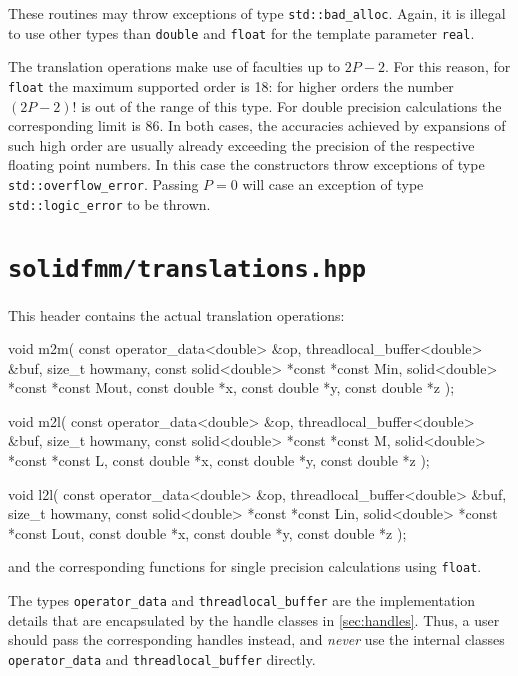 \documentclass{scrbook}
\begin{document}
These routines may throw exceptions of type \lstinline|std::bad_alloc|. Again,
it is illegal to use other types than \lstinline[style=cpp]|double| and
\lstinline[style=cpp]|float| for the template parameter \lstinline|real|.

The translation operations make use of faculties up to $2P-2$. For this
reason, for \lstinline[style=cpp]|float| the maximum supported order is 18:
for higher orders the number $(2P-2)!$ is out of the range of this type. For
double precision calculations the corresponding limit is 86. In both cases,
the accuracies achieved by expansions of such high order are usually already
exceeding the precision of the respective floating point numbers. In this
case the constructors throw exceptions of type \lstinline|std::overflow_error|.
Passing $P=0$ will case an exception of type \lstinline|std::logic_error| to be
thrown.


\section{\texttt{solidfmm/translations.hpp}}
This header contains the actual translation operations:
\begin{cppcode*}
void m2m( const operator_data<double> &op, threadlocal_buffer<double> &buf, 
          size_t howmany, const solid<double> *const *const Min,
                                solid<double> *const *const Mout,
          const double *x, const double *y, const double *z );

void m2l( const operator_data<double> &op, threadlocal_buffer<double> &buf, 
          size_t howmany, const solid<double> *const *const M,
                                solid<double> *const *const L,
          const double *x, const double *y, const double *z );


void l2l( const operator_data<double> &op, threadlocal_buffer<double> &buf, 
          size_t howmany, const solid<double> *const *const Lin,
                                solid<double> *const *const Lout,
          const double *x, const double *y, const double *z );
\end{cppcode*}
and the corresponding functions for single precision calculations using
\lstinline[style=cpp]|float|.

The types \lstinline|operator_data| and \lstinline|threadlocal_buffer| are the
implementation details that are encapsulated by the handle classes in
\cref{sec:handles}. Thus, a user should pass the corresponding handles instead,
and \emph{never} use the internal classes \lstinline|operator_data| and
\lstinline|threadlocal_buffer| directly.
\end{document}
